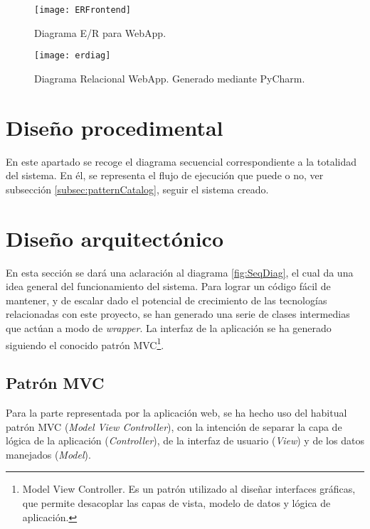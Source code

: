 \begin{figure}
	\centering
	\texttt{[image: ERFrontend]}
	\caption{Diagrama E/R para WebApp.}\label{fig:erFront}
\end{figure}

\begin{figure}
	\centering
	\texttt{[image: erdiag]}
	\caption[Diagrama Relacional WebApp]{Diagrama Relacional WebApp. Generado mediante PyCharm.}\label{fig:erdiag}
\end{figure}

\section{Diseño procedimental}
En este apartado se recoge el diagrama secuencial correspondiente a la totalidad  del sistema. En él, se representa el flujo de ejecución que puede o no, ver subsección \ref{subsec:patternCatalog}, seguir el sistema creado. 




\section{Diseño arquitectónico}
En esta sección se dará una aclaración al diagrama \ref{fig:SeqDiag}, el cual da una idea general del funcionamiento del sistema. 
Para lograr un código fácil de mantener, y de escalar dado el potencial de crecimiento de las tecnologías relacionadas con este proyecto, se han generado una serie de clases intermedias que actúan a modo de \textit{wrapper}. La interfaz de la aplicación se ha generado siguiendo el conocido patrón MVC\footnote{Model View Controller. Es un patrón utilizado al diseñar interfaces gráficas, que permite desacoplar las capas de vista, modelo de datos y lógica de aplicación.}.

\subsection{Patrón MVC}
Para la parte representada por la aplicación web, se ha hecho uso del habitual patrón MVC (\textit{Model View Controller}), con la intención de separar la capa de lógica de la aplicación (\textit{Controller}), de la interfaz de usuario (\textit{View}) y de los datos manejados (\textit{Model}).


